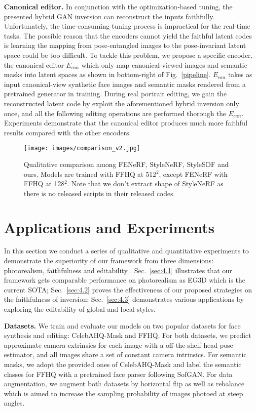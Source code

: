 \documentclass[acmtog]{acmart}
\begin{document}
\noindent \textbf{Canonical editor.} 
In conjunction with the optimization-based tuning, the presented hybrid GAN inversion can reconstruct the inputs faithfully. Unfortunately, the time-consuming tuning process is impractical for the real-time tasks. The possible reason that the encoders cannot yield the faithful latent codes is learning the mapping from pose-entangled images to the pose-invariant latent space could be too difficult. To tackle this problem, we propose a specific encoder, the canonical editor $E_{can}$ which only map canonical-viewed images and semantic masks into latent spaces as shown in bottom-right of Fig.~\ref{pipeline}. $E_{can}$ takes as input canonical-view synthetic face images and semantic masks rendered from a pretrained generator in training. During real portrait editing, we gain the reconstructed latent code by exploit the aforementioned hybrid inversion only once, and all the following editing operations are performed thorough the $E_{can}$. Experiments demonstrate that the canonical editor produces much more faithful results compared with the other encoders.



\begin{figure}[t]
  \centering
  \texttt{[image: images/comparison\_v2.jpg]}
  \caption{Qualitative comparison among FENeRF, StyleNeRF, StyleSDF and ours. Models are trained with FFHQ at 512$^{2}$, except FENeRF with FFHQ at 128$^{2}$. Note that we don't extract shape of StyleNeRF as there is no released scripts in their released codes.}
  \Description{}
  \label{comparison}
\end{figure}


\section{Applications and Experiments}
In this section we conduct a series of qualitative and quantitative experiments to demonstrate the superiority of our framework from three dimensions: photorealism, faithfulness and editability \cite{xia2021gan}. Sec.~\ref{sec:4.1} illustrates that our framework gets comparable performance on photorealism as EG3D which is the current SOTA; Sec.~\ref{sec:4.2} proves the effectiveness of our proposed strategies on the faithfulness of inversion; Sec.~\ref{sec:4.3} demonstrates various applications by exploring the editability of global and local styles.

\noindent \textbf{Datasets.}  We train and evaluate our models on two popular datasets for face synthesis and editing: CelebAHQ-Mask\cite{CelebAMask-HQ} and FFHQ\cite{karras2019style}. For both datasets, we predict approximate camera extrinsics for each image with a off-the-shelf head pose estimator\cite{deng2019accurate}, and all images share a set of constant camera intrinsics. For semantic masks, we adopt the provided ones of CelebAHQ-Mask and label the semantic classes for FFHQ with a pretrained face parser following SofGAN. For data augmentation, we augment both datasets by horizontal flip as well as rebalance which is aimed to increase the sampling probability of images photoed at steep angles.
\end{document}
